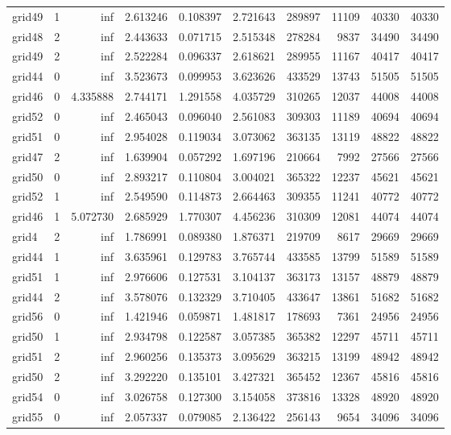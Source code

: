 \begin{longtable}{|l|r|r|r|r|r|r|r|r|r|}
grid49 & 1 & inf & 2.613246 & 0.108397 & 2.721643 & 289897 & 11109 & 40330 & 40330 \\
grid48 & 2 & inf & 2.443633 & 0.071715 & 2.515348 & 278284 & 9837 & 34490 & 34490 \\
grid49 & 2 & inf & 2.522284 & 0.096337 & 2.618621 & 289955 & 11167 & 40417 & 40417 \\
grid44 & 0 & inf & 3.523673 & 0.099953 & 3.623626 & 433529 & 13743 & 51505 & 51505 \\
grid46 & 0 & 4.335888 & 2.744171 & 1.291558 & 4.035729 & 310265 & 12037 & 44008 & 44008 \\
grid52 & 0 & inf & 2.465043 & 0.096040 & 2.561083 & 309303 & 11189 & 40694 & 40694 \\
grid51 & 0 & inf & 2.954028 & 0.119034 & 3.073062 & 363135 & 13119 & 48822 & 48822 \\
grid47 & 2 & inf & 1.639904 & 0.057292 & 1.697196 & 210664 & 7992 & 27566 & 27566 \\
grid50 & 0 & inf & 2.893217 & 0.110804 & 3.004021 & 365322 & 12237 & 45621 & 45621 \\
grid52 & 1 & inf & 2.549590 & 0.114873 & 2.664463 & 309355 & 11241 & 40772 & 40772 \\
grid46 & 1 & 5.072730 & 2.685929 & 1.770307 & 4.456236 & 310309 & 12081 & 44074 & 44074 \\
grid4 & 2 & inf & 1.786991 & 0.089380 & 1.876371 & 219709 & 8617 & 29669 & 29669 \\
grid44 & 1 & inf & 3.635961 & 0.129783 & 3.765744 & 433585 & 13799 & 51589 & 51589 \\
grid51 & 1 & inf & 2.976606 & 0.127531 & 3.104137 & 363173 & 13157 & 48879 & 48879 \\
grid44 & 2 & inf & 3.578076 & 0.132329 & 3.710405 & 433647 & 13861 & 51682 & 51682 \\
grid56 & 0 & inf & 1.421946 & 0.059871 & 1.481817 & 178693 & 7361 & 24956 & 24956 \\
grid50 & 1 & inf & 2.934798 & 0.122587 & 3.057385 & 365382 & 12297 & 45711 & 45711 \\
grid51 & 2 & inf & 2.960256 & 0.135373 & 3.095629 & 363215 & 13199 & 48942 & 48942 \\
grid50 & 2 & inf & 3.292220 & 0.135101 & 3.427321 & 365452 & 12367 & 45816 & 45816 \\
grid54 & 0 & inf & 3.026758 & 0.127300 & 3.154058 & 373816 & 13328 & 48920 & 48920 \\
grid55 & 0 & inf & 2.057337 & 0.079085 & 2.136422 & 256143 & 9654 & 34096 & 34096 \\

\end{longtable}
